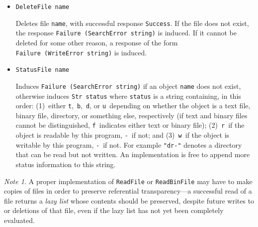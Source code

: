 \begin{itemize}
Identical to \mbox{\tt WriteFile} [\mbox{\tt WriteBinFile}], except that (1)~the \mbox{\tt string} [\mbox{\tt bin}] argument
is appended to the current contents of the file named \mbox{\tt name}; (2)~if
the I/O mode does not match the previous mode with which \mbox{\tt name} was
written, the behaviour is not specified; and (3)~if the file does not
exist, the response \mbox{\tt Failure\ (SearchError\ string)} is induced.
All other errors have form
\mbox{\tt Failure\ (WriteError\ string)}, and both
requests are hyperstrict in their second argument.

\item
\mbox{\tt DeleteFile\ name}

Deletes file \mbox{\tt name}, with successful response \mbox{\tt Success}.  If
the file does not exist, the response \mbox{\tt Failure\ (SearchError\ string)}
is induced.  If it cannot be deleted for some other reason, a response
of the form \mbox{\tt Failure\ (WriteError\ string)} is induced.

\item
\mbox{\tt StatusFile\ name}

Induces \mbox{\tt Failure\ (SearchError\ string)} if an object \mbox{\tt name}
does not exist, otherwise induces \mbox{\tt Str\ status} where \mbox{\tt status} is a
string containing, in this order: (1)~either \fwq\mbox{\tt t}\fwq,\
\fwq\mbox{\tt b}\fwq,\ \fwq\mbox{\tt d}\fwq, or \fwq\mbox{\tt u}\fwq\ depending on whether the
object is a text file, binary file, directory, or something else,
respectively (if text and binary files cannot be distinguished,
\fwq\mbox{\tt f}\fwq\ indicates either text or binary file);
(2)~\fwq\mbox{\tt r}\fwq\ if the object is readable by this program,
\fwq\mbox{\tt -}\fwq\ if not; and (3)~\fwq\mbox{\tt w}\fwq\ if the object is writable by this
program, \fwq\mbox{\tt -}\fwq\ if not.  For example \mbox{\tt "dr-"} denotes a directory
that can be read but not written.  An implementation is
free to append more status information to this string.
\end{itemize}

{\em Note 1.} A proper implementation of \mbox{\tt ReadFile} or \mbox{\tt ReadBinFile} may
have to make copies of files in order to preserve referential
transparency---a successful read of a file returns a {\em lazy list}
whose contents should be preserved, despite future writes to or
deletions of that file, even if the lazy list has not yet been completely
evaluated.

